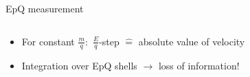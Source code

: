 \documentclass{beamer}
\begin{document}
\begin{frame}{EpQ measurement}
\begin{columns}
	\end{columns}
\vspace{-0.5cm}
	\begin{itemize}
		\item For constant $\frac{m}{q}:$ $\frac{E}{q}$-step $\widehat{=}$ absolute value of velocity
		\item Integration over EpQ shells $\rightarrow$ loss of information!
	\end{itemize}
\end{frame}
\end{document}
